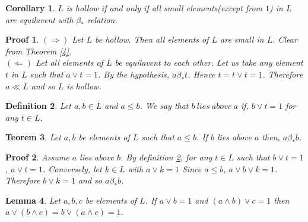\documentclass[a4paper,12pt]{article}
\numberwithin{equation}{section}
\theoremstyle{italik}
\newtheorem{teorem}{Teorem}[section]
\newtheorem{lemma}[teorem]{Lemma}
\newtheorem{sonuc}[teorem]{Corollary}
\newtheorem{tanim}[teorem]{Definition}
\newtheorem*{ispat}{Proof}
\begin{document}
\begin{sonuc} \label{5}
  $ L $ is hollow if and only if all small elements(except from $ 1 $) in $ L $ are equilavent with $ \beta_* $ relation. 
\end{sonuc}
\begin{ispat}
  $ ( \Rightarrow ) $
  Let $ L $ be hollow. Then all elements of $ L $ are small in $ L $. Clear from Theorem \ref{4}. \\
  $ ( \Leftarrow ) $ 
  Let all elements of $ L $ be equilavent to each other. Let us take any element $ t $ in $ L $ 
  such that $ a \vee t = 1 $. By the hypothesis, $ a \beta_* t $. Hence $ t = t \vee t = 1 $. 
  Therefore $ a \ll L $ and so $ L $ is hollow. 
\end{ispat}
\begin{tanim}\label{51}
  Let $ a, b \in L $ and $ a \leq b $. We say that $ b\  lies\  above\  a $ if, 
  $ b \vee t = 1 $ for any $ t \in L $.
\end{tanim}
\begin{teorem}\label{6}
  Let $ a,b $ be elements of $ L $ such that $ a \leq b $. 
  If $ b $ lies above $ a $ then, $ a \beta_* b $. 
\end{teorem}
\begin{ispat}
  Assume $ a $ lies above $ b $. By definition \ref{51}, for any $ t \in L $ such that $ b \vee t = 1 $, 
  $ a \vee t = 1 $. Conversely, let $ k \in L $ with $ a \vee k = 1 $  
  Since $ a \leq b $, $ a \vee b \vee k = 1 $. Therefore $ b \vee k = 1 $ and so $ a \beta_* b $.

\end{ispat}
\begin{lemma}\label{7}
  Let $ a,b,c $ be elements of $ L $.
  If $ a \vee b = 1 $ and $ ( a \wedge b ) \vee c =1 $
  then $ a \vee(b \wedge c)=b \vee ( a \wedge c ) = 1 $.
\end{lemma}
\end{document}
